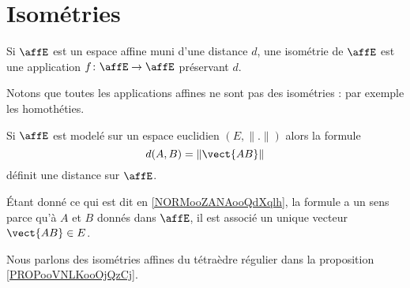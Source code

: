\section{Isométries}

\begin{definition}       \label{DEFooZGKBooGgjkgs}
     Si \( \affE\) est un espace affine muni d'une distance \( d\), une isométrie de \( \affE\) est une application \( f\colon \affE\to \affE\) préservant \( d\).
\end{definition}
Notons que toutes les applications affines ne sont pas des isométries : par exemple les homothéties.

Si \( \affE\) est modelé sur un espace euclidien \( (E,\| . \|)\) alors la formule
\begin{equation}
    d(A,B)=\| \vect{ AB } \|
\end{equation}
définit une distance sur \( \affE\).

Étant donné ce qui est dit en \ref{NORMooZANAooQdXqlh}, la formule a un sens parce qu'à \( A\) et \( B\) donnés dans \( \affE\), il est associé un unique vecteur \( \vect{ AB }\in E\).

Nous parlons des isométries affines du tétraèdre régulier dans la proposition \ref{PROPooVNLKooOjQzCj}.
